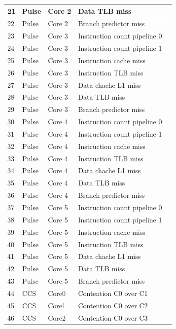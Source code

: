 \begin{table}[H]
\begin{tiny}
\begin{tabular}{|l|l|l|l|l|}
			\hline 
			21 & Pulse & Core 2 &  Data TLB miss \\
			\hline 
			22 & Pulse & Core 2 &  Branch predictor miss \\
			\hline 
			23 & Pulse & Core 3 &  Instruction count pipeline 0 \\
			\hline 
			24 & Pulse & Core 3 &  Instruction count pipeline 1 \\
			\hline 
			25 & Pulse & Core 3 &  Instruction cache miss \\
			\hline 
			26 & Pulse & Core 3 &  Instruction TLB miss \\
			\hline 
			27 & Pulse & Core 3 &  Data chache L1 miss \\
			\hline 
			28 & Pulse & Core 3 &  Data TLB miss \\
			\hline 
			29 & Pulse & Core 3 &  Branch predictor miss \\
			\hline 
			30 & Pulse & Core 4 &  Instruction count pipeline 0 \\
			\hline 
			31 & Pulse & Core 4 &  Instruction count pipeline 1 \\
			\hline 
			32 & Pulse & Core 4 &  Instruction cache miss \\
			\hline 
			33 & Pulse & Core 4 &  Instruction TLB miss \\
			\hline 
			34 & Pulse & Core 4 &  Data chache L1 miss \\
			\hline 
			35 & Pulse & Core 4 &  Data TLB miss \\
			\hline 
			36 & Pulse & Core 4 &  Branch predictor miss \\
			\hline 
			37 & Pulse & Core 5 &  Instruction count pipeline 0 \\
			\hline 
			38 & Pulse & Core 5 &  Instruction count pipeline 1 \\
			\hline 
			39 & Pulse & Core 5 &  Instruction cache miss \\
			\hline 
			40 & Pulse & Core 5 &  Instruction TLB miss \\
			\hline 
			41 & Pulse & Core 5 &  Data chache L1 miss \\
			\hline 
			42 & Pulse & Core 5 &  Data TLB miss \\
			\hline 
			43 & Pulse & Core 5 &  Branch predictor miss \\
			\hline 
			44 & CCS & Core0 &  Contention C0 over C1\\
			\hline 
			45 & CCS & Core1 &  Contention C0 over C2\\
			\hline 
			46 & CCS & Core2 &  Contention C0 over C3\\

\end{tabular}
\end{tiny}
\end{table}
